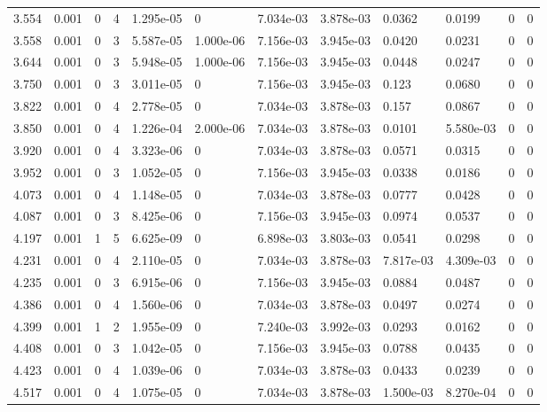 \documentclass[preview]{standalone}
\begin{document}
{{{\begin{tabular}{L{1.2cm}C{1.2cm} C{0.3cm}C{0.5cm} C{1.4cm}C{1.4cm} C{1.4cm}C{1.4cm} C{1.6cm}C{1.6cm} C{1.6cm}C{1.6cm}}
  3.554  &  0.001  & 0     &  4 &  1.295e-05  & 0  &  7.034e-03&   3.878e-03& 0.0362 & 0.0199   &  0 & 0  \\ 
  3.558  &  0.001  & 0     &  3 &  5.587e-05  & 1.000e-06  &  7.156e-03&   3.945e-03& 0.0420 & 0.0231   &  0 & 0  \\ 
  3.644  &  0.001  & 0     &  3 &  5.948e-05  & 1.000e-06  &  7.156e-03&   3.945e-03& 0.0448 & 0.0247   &  0 & 0  \\ 
  3.750  &  0.001  & 0     &  3 &  3.011e-05  & 0  &  7.156e-03&   3.945e-03& 0.123 & 0.0680   &  0 & 0  \\ 
  3.822  &  0.001  & 0     &  4 &  2.778e-05  & 0  &  7.034e-03&   3.878e-03& 0.157 & 0.0867   &  0 & 0  \\ 
  3.850  &  0.001  & 0     &  4 &  1.226e-04  & 2.000e-06  &  7.034e-03&   3.878e-03& 0.0101 & 5.580e-03   &  0 & 0  \\ 
  3.920  &  0.001  & 0     &  4 &  3.323e-06  & 0  &  7.034e-03&   3.878e-03& 0.0571 & 0.0315   &  0 & 0  \\ 
  3.952  &  0.001  & 0     &  3 &  1.052e-05  & 0  &  7.156e-03&   3.945e-03& 0.0338 & 0.0186   &  0 & 0  \\ 
  4.073  &  0.001  & 0     &  4 &  1.148e-05  & 0  &  7.034e-03&   3.878e-03& 0.0777 & 0.0428   &  0 & 0  \\ 
  4.087  &  0.001  & 0     &  3 &  8.425e-06  & 0  &  7.156e-03&   3.945e-03& 0.0974 & 0.0537   &  0 & 0  \\ 
  4.197  &  0.001  & 1     &  5 &  6.625e-09  & 0  &  6.898e-03&   3.803e-03& 0.0541 & 0.0298   &  0 & 0  \\ 
  4.231  &  0.001  & 0     &  4 &  2.110e-05  & 0  &  7.034e-03&   3.878e-03& 7.817e-03 & 4.309e-03   &  0 & 0  \\ 
  4.235  &  0.001  & 0     &  3 &  6.915e-06  & 0  &  7.156e-03&   3.945e-03& 0.0884 & 0.0487   &  0 & 0  \\ 
  4.386  &  0.001  & 0     &  4 &  1.560e-06  & 0  &  7.034e-03&   3.878e-03& 0.0497 & 0.0274   &  0 & 0  \\ 
  4.399  &  0.001  & 1     &  2 &  1.955e-09  & 0  &  7.240e-03&   3.992e-03& 0.0293 & 0.0162   &  0 & 0  \\ 
  4.408  &  0.001  & 0     &  3 &  1.042e-05  & 0  &  7.156e-03&   3.945e-03& 0.0788 & 0.0435   &  0 & 0  \\ 
  4.423  &  0.001  & 0     &  4 &  1.039e-06  & 0  &  7.034e-03&   3.878e-03& 0.0433 & 0.0239   &  0 & 0  \\ 
  4.517  &  0.001  & 0     &  4 &  1.075e-05  & 0  &  7.034e-03&   3.878e-03& 1.500e-03 & 8.270e-04   &  0 & 0  \\ 

\end{tabular}}}}
\end{document}
